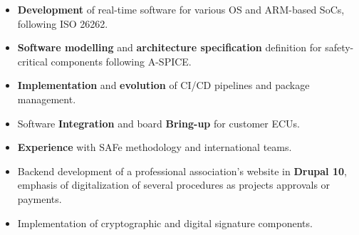 \documentclass[10pt,a4paper,ragged2e,withhyper]{altacv}
\begin{document}
    \begin{paracol}{2}
    

     
                \begin{itemize}
                    \item \textbf{Development} of real-time software for various OS and ARM-based SoCs, following ISO 26262.
                    \item \textbf{Software modelling} and \textbf{architecture specification} definition for safety-critical components following A-SPICE.
                    \item \textbf{Implementation} and \textbf{evolution} of CI/CD pipelines and package management.
                    \item Software \textbf{Integration} and board \textbf{Bring-up} for customer ECUs.
                    \item \textbf{Experience} with SAFe methodology and international teams.
                \end{itemize}

                \divider\newline
        
            
                \begin{itemize}
                    \item Backend development of a professional association's website in \textbf{Drupal 10}, emphasis of digitalization of several procedures as projects approvals or payments.
                    \item Implementation of cryptographic and digital signature components.
                \end{itemize}
                
            
                

\end{paracol}
\end{document}
